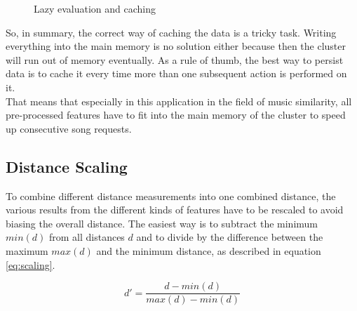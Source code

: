 \begin{figure}[htbp]
	\centering
	\caption{Lazy evaluation and caching}
	\label{lazcach}
\end{figure}
\FloatBarrier

\noindent So, in summary, the correct way of caching the data is a tricky task. Writing everything into the main memory is no solution either because then the cluster will run out of memory eventually. As a rule of thumb, the best way to persist data is to cache it every time more than one subsequent action is performed on it.\\
That means that especially in this application in the field of music similarity, all pre-processed features have to fit into the main memory of the cluster to speed up consecutive song requests. 

\subsection{Distance Scaling}\label{distsc}

To combine different distance measurements into one combined distance, the various results from the different kinds of features have to be rescaled to avoid biasing the overall distance.
The easiest way is to subtract the minimum $min(d)$ from all distances $d$ and to divide by the difference between the maximum $max(d)$ and the minimum distance, as described in equation \eqref{eq:scaling}. 

\begin{equation} \label{eq:scaling}
d' = \frac{d - min(d)}{max(d) - min(d)}
\end{equation}

